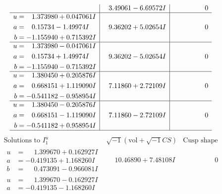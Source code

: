 \documentclass[1p]{elsarticle_modified}
\theoremstyle{definition}
\newcommand{\I}{\sqrt{-1}}
\begin{document}
$$\begin{array}{c|c|c}
 & \phantom{-}3.49061 - 6.69572 I & \phantom{-0.000000 } 0 \\ \hline\begin{aligned}
u &= \phantom{-}1.373980 + 0.047061 I \\
a &= \phantom{-}0.15734 - 1.49974 I \\
b &= -1.155940 + 0.715392 I\end{aligned}
 & \phantom{-}9.36202 + 5.02654 I & \phantom{-0.000000 } 0 \\ \hline\begin{aligned}
u &= \phantom{-}1.373980 - 0.047061 I \\
a &= \phantom{-}0.15734 + 1.49974 I \\
b &= -1.155940 - 0.715392 I\end{aligned}
 & \phantom{-}9.36202 - 5.02654 I & \phantom{-0.000000 } 0 \\ \hline\begin{aligned}
u &= \phantom{-}1.380450 + 0.205876 I \\
a &= \phantom{-}0.668151 + 1.119090 I \\
b &= -0.541182 - 0.958954 I\end{aligned}
 & \phantom{-}7.11860 + 2.72109 I & \phantom{-0.000000 } 0 \\ \hline\begin{aligned}
u &= \phantom{-}1.380450 - 0.205876 I \\
a &= \phantom{-}0.668151 - 1.119090 I \\
b &= -0.541182 + 0.958954 I\end{aligned}
 & \phantom{-}7.11860 - 2.72109 I & \phantom{-0.000000 } 0\\
 \hline 
 \end{array}$$\newpage$$\begin{array}{c|c|c}  
\text{Solutions to }I^u_{1}& \I (\text{vol} + \sqrt{-1}CS) & \text{Cusp shape}\\
 \hline 
\begin{aligned}
u &= \phantom{-}1.399670 + 0.162927 I \\
a &= -0.419135 + 1.168260 I \\
b &= \phantom{-}0.473091 - 0.966081 I\end{aligned}
 & \phantom{-}10.46890 + 7.48108 I & \phantom{-0.000000 } 0 \\ \hline\begin{aligned}
u &= \phantom{-}1.399670 - 0.162927 I \\
a &= -0.419135 - 1.168260 I \\

\end{aligned}
\end{array}$$
\end{document}
